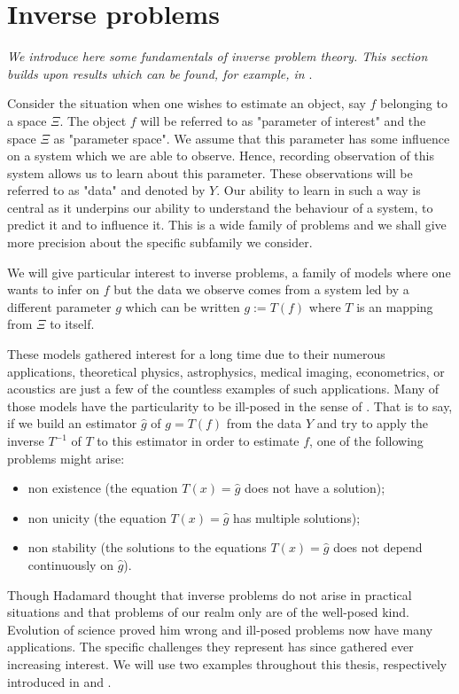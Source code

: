 \section{Inverse problems}\label{INTRO_INVERSEPROBLEMS}
\textit{We introduce here some fundamentals of inverse problem theory. This section builds upon results which can be found, for example, in }.

Consider the situation when one wishes to estimate an object, say $f$ belonging to a space $\Xi$.
The object $f$ will be referred to as "parameter of interest" and the space $\Xi$ as "parameter space".
We assume that this parameter has some influence on a system which we are able to observe.
Hence, recording observation of this system allows us to learn about this parameter.
These observations will be referred to as "data" and denoted by $Y$.
Our ability to learn in such a way is central as it underpins our ability to understand the behaviour of a system, to predict it and to influence it.
This is a wide family of problems and we shall give more precision about the specific subfamily we consider.

We will give particular interest to inverse problems, a family of models where one wants to infer on $f$ but the data we observe comes from a system led by a different parameter $g$ which can be written $g := T(f)$ where $T$ is an mapping from $\Xi$ to itself.

These models gathered interest for a long time due to their numerous applications, theoretical physics, astrophysics, medical imaging, econometrics, or acoustics are just a few of the countless examples of such applications.
Many of those models have the particularity to be ill-posed in the sense of \citet{cite:hadamard}.
That is to say, if we build an estimator $\widehat{g}$ of $g = T(f)$ from the data $Y$ and try to apply the inverse $T^{-1}$ of $T$ to this estimator in order to estimate $f$, one of the following problems might arise:
\begin{itemize}
\item non existence (the equation $T(x) = \widehat{g}$ does not have a solution);
\item non unicity (the equation $T(x) = \widehat{g}$ has multiple solutions);
\item non stability (the solutions to the equations $T(x) = \widehat{g}$ does not depend continuously on $\widehat{g}$).
\end{itemize}

Though Hadamard thought that inverse problems do not arise in practical situations and that problems of our realm only are of the well-posed kind.
Evolution of science proved him wrong and ill-posed problems now have many applications.
The specific challenges they represent has since gathered ever increasing interest.
We will use two examples throughout this thesis, respectively introduced in  and .

